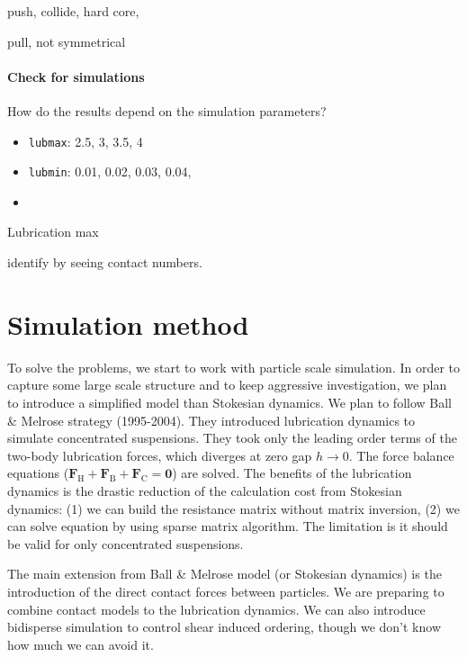 \documentclass[11pt]{scrartcl}
\begin{document}
push, collide, hard core,

pull, not symmetrical


\paragraph{Check for simulations}

How do the results depend on the simulation parameters?

\begin{itemize}
 \item  \texttt{lubmax}: 2.5, 3, 3.5, 4
 \item  \texttt{lubmin}: 0.01, 0.02, 0.03, 0.04,
 \item 

\end{itemize}


Lubrication max 

identify by seeing contact numbers.








\section{Simulation method}

To solve the problems,
we start to work with particle scale simulation.
%
In order to capture some large scale structure
and to keep aggressive investigation,
we plan to introduce a simplified model than Stokesian dynamics.
%
We plan to follow Ball \& Melrose strategy (1995-2004).
%
They introduced lubrication dynamics 
to simulate concentrated suspensions.
%
They took only the leading order terms of 
the two-body lubrication forces,
which diverges at zero gap $h\to 0$.
%
The force balance equations 
($\bm{F}_{\mathrm{H}}+\bm{F}_{\mathrm{B}}+\bm{F}_{\mathrm{C}} = \bm{0}$)
are solved.
%
The benefits of the lubrication dynamics is 
the drastic reduction of the calculation cost from Stokesian dynamics:
(1) we can build the resistance matrix without matrix inversion,
(2) we can solve equation by using sparse matrix algorithm.
%
The limitation is 
it should be valid for only concentrated suspensions.
%


The main extension from Ball \& Melrose model (or Stokesian dynamics)
is the introduction of the direct contact forces between particles.
%
We are preparing to combine contact models 
to the lubrication dynamics.
%
We can also introduce bidisperse simulation
to control shear induced ordering,
though we don't know how much we can avoid it.
\end{document}
